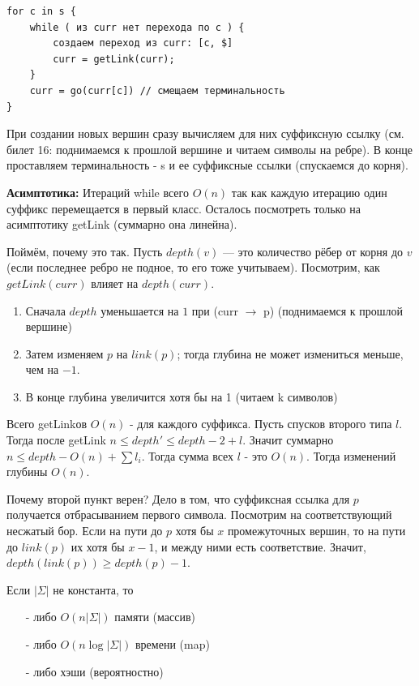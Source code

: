 \begin{lstlisting}
for c in s {
    while ( из curr нет перехода по c ) {
        создаем переход из curr: [c, $]
        curr = getLink(curr);
    }
    curr = go(curr[c]) // смещаем терминальность
}
\end{lstlisting}
\par При создании новых вершин сразу вычисляем для них суффиксную ссылку (см. билет 16: поднимаемся к прошлой вершине и читаем символы на ребре). В конце проставляем терминальность - s и ее суффиксные ссылки (спускаемся до корня).
\par \textbf{Асимптотика:} Итераций while всего $O(n)$ так как каждую итерацию один суффикс перемещается в первый класс. Осталось посмотреть только на асимптотику getLink (суммарно она линейна).

\par Поймём, почему это так. Пусть $depth(v)$ — это количество рёбер от корня до $v$ (если последнее ребро не подное, то его тоже учитываем). Посмотрим, как $getLink(curr)$ влияет на $depth(curr)$. 
\begin{enumerate}
    \item Сначала $depth$ уменьшается на $1$ при (curr $\rightarrow$ p) (поднимаемся к прошлой вершине)
    \item Затем изменяем $p$ на $link(p)$; тогда глубина не может измениться меньше, чем на $-1$.
    \item В конце глубина увеличится хотя бы на 1 (читаем k символов)
\end{enumerate}  Всего getLinkов $O(n)$ - для каждого суффикса. Пусть спусков второго типа $l$. Тогда после getLink $n \leq depth' \leq depth - 2 + l$. Значит суммарно $n \leq depth - O(n) + \sum l_i$. Тогда сумма всех $l$ - это  $O(n)$. Тогда изменений глубины $O(n)$.
\par Почему второй пункт верен? Дело в том, что суффиксная ссылка для $p$ получается отбрасыванием первого символа. Посмотрим на соответствующий несжатый бор. Если на пути до $p$ хотя бы $x$ промежуточных вершин, то на пути до $link(p)$ их хотя бы $x - 1$, и между ними есть соответствие. Значит, $depth(link(p)) \geqslant depth(p) - 1$.
\par Если $|\Sigma|$ не константа, то
\begin{itemize}
    \item[-] либо $O(n|\Sigma|)$ памяти (массив)
    \item[-] либо $O(n \log |\Sigma|)$ времени (map)
    \item[-] либо хэши (вероятностно)
\end{itemize}
\newpage{}

